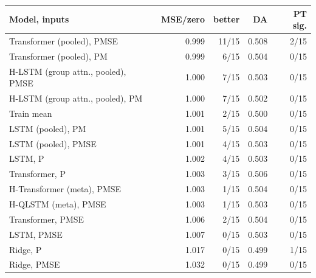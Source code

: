 \begin{tabular}{lrrrr}
\toprule
Model, inputs & MSE/zero & better & DA & PT sig. \\
\midrule
Transformer (pooled), PMSE & 0.999 & 11/15 & 0.508 & 2/15 \\
Transformer (pooled), PM & 0.999 & 6/15 & 0.504 & 0/15 \\
H-LSTM (group attn., pooled), PMSE & 1.000 & 7/15 & 0.503 & 0/15 \\
H-LSTM (group attn., pooled), PM & 1.000 & 7/15 & 0.502 & 0/15 \\
Train mean & 1.001 & 2/15 & 0.500 & 0/15 \\
LSTM (pooled), PM & 1.001 & 5/15 & 0.504 & 0/15 \\
LSTM (pooled), PMSE & 1.001 & 4/15 & 0.503 & 0/15 \\
LSTM, P & 1.002 & 4/15 & 0.503 & 0/15 \\
Transformer, P & 1.003 & 3/15 & 0.506 & 0/15 \\
H-Transformer (meta), PMSE & 1.003 & 1/15 & 0.504 & 0/15 \\
H-QLSTM (meta), PMSE & 1.003 & 1/15 & 0.503 & 0/15 \\
Transformer, PMSE & 1.006 & 2/15 & 0.504 & 0/15 \\
LSTM, PMSE & 1.007 & 0/15 & 0.503 & 0/15 \\
Ridge, P & 1.017 & 0/15 & 0.499 & 1/15 \\
Ridge, PMSE & 1.032 & 0/15 & 0.499 & 0/15 \\
\bottomrule
\end{tabular}
